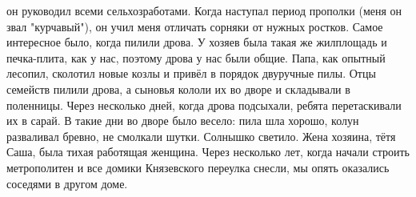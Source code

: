 \label{156-1}
он руководил всеми сельхозработами. Когда наступал период прополки (меня он звал "курчавый"), он учил меня отличать сорняки от нужных ростков. Самое интересное было, когда пилили дрова. У хозяев была такая же жилплощадь и печка-плита, как у нас, поэтому дрова у нас были общие. Папа, как опытный лесопил, сколотил новые козлы и привёл в порядок двуручные пилы. Отцы семейств пилили дрова, а сыновья кололи их во дворе и складывали в поленницы. Через несколько дней, когда дрова подсыхали, ребята перетаскивали их в сарай. В такие дни во дворе было весело: пила шла хорошо, колун разваливал бревно, не смолкали шутки. Солнышко светило. Жена хозяина, тётя Саша, была тихая работящая женщина. Через несколько лет, когда начали строить метрополитен и все домики Князевского переулка снесли, мы опять оказались соседями в другом доме.